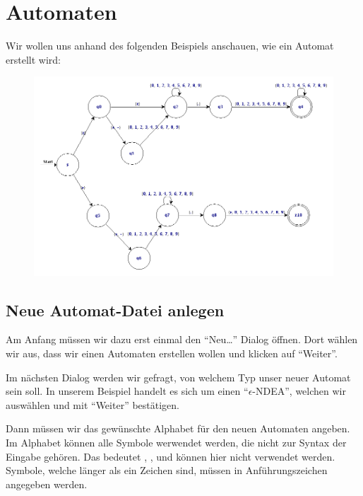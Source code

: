 

\chapter{Automaten}

Wir wollen uns anhand des folgenden Beispiels anschauen, wie ein Automat
erstellt wird:\vspace{10pt}

\begin{figure}[h]
\begin{center}
\includegraphics[width=12cm]{../images/enfa_example.png}
\end{center}
\end{figure}

\section{Neue Automat-Datei anlegen}

Am Anfang müssen wir dazu erst einmal den "`Neu\ldots"' Dialog öffnen. Dort
wählen wir aus, dass wir einen Automaten erstellen wollen und klicken
auf "`Weiter"'.\vspace{10pt}

Im nächsten Dialog werden wir gefragt, von welchem Typ unser neuer
Automat sein soll. In unserem Beispiel handelt es sich um einen
"`$\epsilon$-NDEA"', welchen wir auswählen und mit "`Weiter"'
bestätigen.\vspace{10pt}

Dann müssen wir das gewünschte Alphabet für den neuen Automaten
angeben. Im Alphabet können alle Symbole werwendet werden, die nicht zur Syntax
der Eingabe gehören. Das bedeutet \Symbol{,}, \Symbol{\{}, \Symbol{\}} und
\SymbolEmpty{} können hier nicht verwendet werden. Symbole, welche länger als ein
Zeichen sind, müssen in Anführungszeichen angegeben werden.\vspace{10pt}

